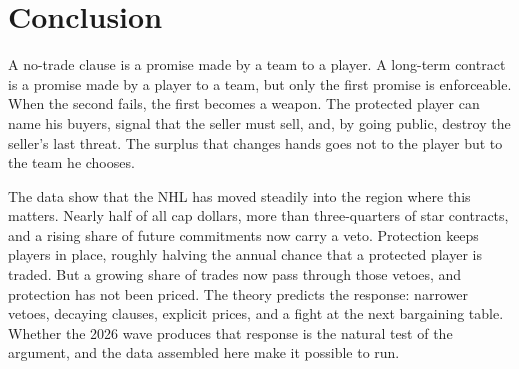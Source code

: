 \section{Conclusion}\label{sec:conclusion}

A no-trade clause is a promise made by a team to a player. A long-term contract is a promise made by a player to a team, but only the first promise is enforceable. When the second fails, the first becomes a weapon. The protected player can name his buyers, signal that the seller must sell, and, by going public, destroy the seller's last threat. The surplus that changes hands goes not to the player but to the team he chooses.

The data show that the NHL has moved steadily into the region where this matters. Nearly half of all cap dollars, more than three-quarters of star contracts, and a rising share of future commitments now carry a veto. Protection keeps players in place, roughly halving the annual chance that a protected player is traded. But a growing share of trades now pass through those vetoes, and protection has not been priced. The theory predicts the response: narrower vetoes, decaying clauses, explicit prices, and a fight at the next bargaining table. Whether the 2026 wave produces that response is the natural test of the argument, and the data assembled here make it possible to run.
